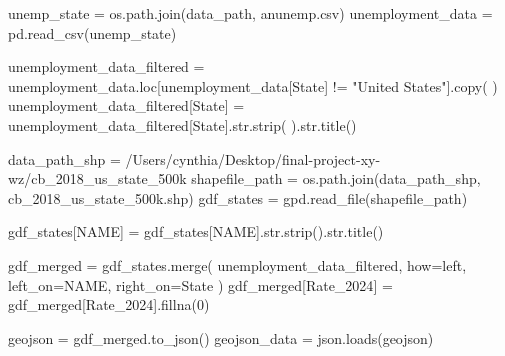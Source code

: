 \documentclass[
  letterpaper,
  DIV=11,
  numbers=noendperiod]{scrartcl}
\newenvironment{Shaded}{\begin{snugshade}}{\end{snugshade}}
\newcommand{\BuiltInTok}[1]{\textcolor[rgb]{0.00,0.23,0.31}{#1}}
\newcommand{\DecValTok}[1]{\textcolor[rgb]{0.68,0.00,0.00}{#1}}
\newcommand{\NormalTok}[1]{\textcolor[rgb]{0.00,0.23,0.31}{#1}}
\newcommand{\OperatorTok}[1]{\textcolor[rgb]{0.37,0.37,0.37}{#1}}
\newcommand{\StringTok}[1]{\textcolor[rgb]{0.13,0.47,0.30}{#1}}
\begin{document}
\begin{Shaded}
\begin{Highlighting}[]
\NormalTok{unemp\_state }\OperatorTok{=}\NormalTok{ os.path.join(data\_path, }\StringTok{\textquotesingle{}anunemp.csv\textquotesingle{}}\NormalTok{)}
\NormalTok{unemployment\_data }\OperatorTok{=}\NormalTok{ pd.read\_csv(unemp\_state)}

\NormalTok{unemployment\_data\_filtered }\OperatorTok{=}\NormalTok{ unemployment\_data.loc[unemployment\_data[}\StringTok{\textquotesingle{}State\textquotesingle{}}\NormalTok{] }\OperatorTok{!=} \StringTok{"United States"}\NormalTok{].copy(}
\NormalTok{)}
\NormalTok{unemployment\_data\_filtered[}\StringTok{\textquotesingle{}State\textquotesingle{}}\NormalTok{] }\OperatorTok{=}\NormalTok{ unemployment\_data\_filtered[}\StringTok{\textquotesingle{}State\textquotesingle{}}\NormalTok{].}\BuiltInTok{str}\NormalTok{.strip(}
\NormalTok{).}\BuiltInTok{str}\NormalTok{.title()}

\NormalTok{data\_path\_shp }\OperatorTok{=} \StringTok{\textquotesingle{}/Users/cynthia/Desktop/final{-}project{-}xy{-}wz/cb\_2018\_us\_state\_500k\textquotesingle{}}
\NormalTok{shapefile\_path }\OperatorTok{=}\NormalTok{ os.path.join(data\_path\_shp, }\StringTok{\textquotesingle{}cb\_2018\_us\_state\_500k.shp\textquotesingle{}}\NormalTok{)}
\NormalTok{gdf\_states }\OperatorTok{=}\NormalTok{ gpd.read\_file(shapefile\_path)}

\NormalTok{gdf\_states[}\StringTok{\textquotesingle{}NAME\textquotesingle{}}\NormalTok{] }\OperatorTok{=}\NormalTok{ gdf\_states[}\StringTok{\textquotesingle{}NAME\textquotesingle{}}\NormalTok{].}\BuiltInTok{str}\NormalTok{.strip().}\BuiltInTok{str}\NormalTok{.title()}

\NormalTok{gdf\_merged }\OperatorTok{=}\NormalTok{ gdf\_states.merge(}
\NormalTok{    unemployment\_data\_filtered, how}\OperatorTok{=}\StringTok{\textquotesingle{}left\textquotesingle{}}\NormalTok{, left\_on}\OperatorTok{=}\StringTok{\textquotesingle{}NAME\textquotesingle{}}\NormalTok{, right\_on}\OperatorTok{=}\StringTok{\textquotesingle{}State\textquotesingle{}}
\NormalTok{)}
\NormalTok{gdf\_merged[}\StringTok{\textquotesingle{}Rate\_2024\textquotesingle{}}\NormalTok{] }\OperatorTok{=}\NormalTok{ gdf\_merged[}\StringTok{\textquotesingle{}Rate\_2024\textquotesingle{}}\NormalTok{].fillna(}\DecValTok{0}\NormalTok{)}

\NormalTok{geojson }\OperatorTok{=}\NormalTok{ gdf\_merged.to\_json()}
\NormalTok{geojson\_data }\OperatorTok{=}\NormalTok{ json.loads(geojson)}


\end{Highlighting}
\end{Shaded}
\end{document}
